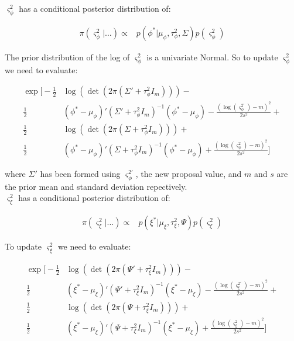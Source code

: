 \documentclass{article}
\begin{document}
\subsubsection*{}

$\varsigma^2_\phi$ has a conditional posterior distribution of:

\begin{align*}
\pi(\varsigma^2_\phi | \dots ) \propto & p(\phi^* | \mu_\phi, \tau^2_\phi, \Sigma) p(\varsigma^2_\phi)
\end{align*}

The prior distribution of the log of $\varsigma^2_\phi$ is a univariate Normal. So to update $\varsigma^2_\phi$ we need to evaluate:

\begin{align}
\exp \Bigg[ - \frac{1}{2}  & \log(\det(2 \pi (\Sigma' + \tau^2_\phi I_m))) - \nonumber \\
\frac{1}{2} &  (\phi^* - \mu_\phi)' (\Sigma' + \tau^2_\phi I_m)^{-1} (\phi^* - \mu_\phi) -
 \frac{(\log(\varsigma^{2'}_\phi) - m)^2}{2 s^2} + \nonumber \\
\frac{1}{2}  & \log(\det(2 \pi (\Sigma + \tau^2_\phi I_m))) + \nonumber \\
\frac{1}{2} & (\phi^* - \mu_\phi)' (\Sigma + \tau^2_\phi I_m)^{-1} (\phi^* - \mu_\phi) + \frac{(\log(\varsigma^2_\phi) - m)^2}{2 s^2} \Bigg] \label{eq:2vs1}
\end{align}

where $\Sigma'$ has been formed using $\varsigma^{2'}_\phi$, the new proposal value, and $m$ and $s$ are the prior mean and standard deviation repectively. \\

$\varsigma^2_\xi$ has a conditional posterior distribution of:

\begin{align*}
\pi(\varsigma^2_\xi | \dots ) \propto & p(\xi^{*} | \mu_\xi, \tau^2_\xi, \Psi) p(\varsigma^2_\xi)
\end{align*}

To update $\varsigma^2_\xi$ we need to evaluate:

\begin{align}
\exp \Bigg[ -\frac{1}{2} & \log(\det(2 \pi (\Psi' + \tau^2_\xi I_m))) - \nonumber \\
\frac{1}{2} & (\xi^{*} - \mu_\xi)' (\Psi' + \tau^2_\xi I_m)^{-1} (\xi^{*} - \mu_\xi) - \frac{(\log(\varsigma^{2'}_\xi) - m)^2}{2 s^2} + \nonumber \\
\frac{1}{2} & \log(\det(2 \pi (\Psi + \tau^2_\xi I_m))) +\nonumber \\
\frac{1}{2} & (\xi^{*} - \mu_\xi)' (\Psi + \tau^2_\xi I_m)^{-1} (\xi^{*} - \mu_\xi) + \frac{(\log(\varsigma^2_\xi) - m)^2}{2 s^2} \Bigg] \label{eq:2vs2}
\end{align}
\end{document}
